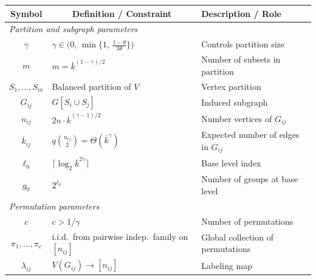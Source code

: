 \documentclass[journal]{IEEEtran}
\theoremstyle{definition}
\theoremstyle{definition}
\newcommand{\kb}{\overline{k}}
\begin{document}
\begin{table}[t]
\centering
\renewcommand{\arraystretch}{1.1}
\begin{tabular}{|c|l|l|}
\hline
\textbf{Symbol} & \textbf{$\qquad$ Definition / Constraint} & \hspace*{1.4cm}\textbf{Description / Role} \\
\hline
\multicolumn{3}{|l|}{\emph{Partition and subgraph parameters}} \\
\hline
$\gamma$             & $\gamma \in \bigl(0,\, \min\{1,\, \tfrac{1-\theta}{3\theta}\}\bigr)$ & Controls partition size             \\
\hline
$m$                  & $m = \kb^{(1-\gamma)/2}$                                              & Number of subsets in partition            \\
\hline
$S_1,\dots,S_m$      & Balanced partition of $V$                                             & Vertex partition                  \\
\hline
$G_{ij}$             & $G[S_i \cup S_j]$                                                     & Induced subgraph                  \\
\hline
$n_{ij}$             & $2n \cdot \kb^{(\gamma-1)/2}$                                         & Number vertices of $G_{ij}$              \\
\hline
$\kb_{ij}$           & $q\binom{n_{ij}}{2} = \Theta(\kb^{\gamma})$                           & Expected number of edges in $G_{ij}$        \\
\hline
$\ell_0$             & $\lceil \log_2 \kb^{2\gamma} \rceil$                                  & Base level index                  \\
\hline
$g_0$                & $2^{\ell_0}$                                                           & Number of groups at base level              \\
\hline
\multicolumn{3}{|l|}{\emph{Permutation parameters}} \\
\hline
$c$                  & $c > 1/\gamma$                                                         & Number of permutations            \\
\hline
$\pi_1,\dots,\pi_c$  & i.i.d.\ from pairwise indep.\ family on $[n_{ij}]$                   & Global collection of permutations          \\
\hline
$\lambda_{ij}$       & $V(G_{ij}) \to [n_{ij}]$                                              & Labeling map                      \\
\hline

\end{tabular}
\end{table}
\end{document}
